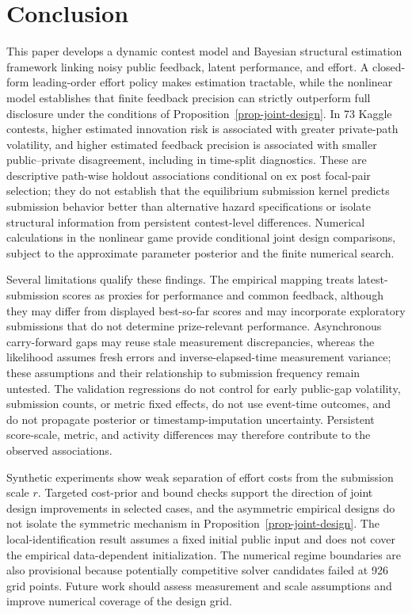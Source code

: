 \documentclass[mnsc]{informs3}
\begin{document}
\section{Conclusion}

{This paper develops a dynamic contest model and Bayesian structural estimation framework linking noisy public feedback, latent performance, and effort. A closed-form leading-order effort policy makes estimation tractable, while the nonlinear model establishes that finite feedback precision can strictly outperform full disclosure under the conditions of Proposition~\ref{prop-joint-design}. In 73 Kaggle contests, higher estimated innovation risk is associated with greater private-path volatility, and higher estimated feedback precision is associated with smaller public--private disagreement, including in time-split diagnostics. These are descriptive path-wise holdout associations conditional on ex post focal-pair selection; they do not establish that the equilibrium submission kernel predicts submission behavior better than alternative hazard specifications or isolate structural information from persistent contest-level differences. Numerical calculations in the nonlinear game provide conditional joint design comparisons, subject to the approximate parameter posterior and the finite numerical search.}

{Several limitations qualify these findings. The empirical mapping treats latest-submission scores as proxies for performance and common feedback, although they may differ from displayed best-so-far scores and may incorporate exploratory submissions that do not determine prize-relevant performance. Asynchronous carry-forward gaps may reuse stale measurement discrepancies, whereas the likelihood assumes fresh errors and inverse-elapsed-time measurement variance; these assumptions and their relationship to submission frequency remain untested. The validation regressions do not control for early public-gap volatility, submission counts, or metric fixed effects, do not use event-time outcomes, and do not propagate posterior or timestamp-imputation uncertainty. Persistent score-scale, metric, and activity differences may therefore contribute to the observed associations.}

{{Synthetic experiments show weak separation of effort costs from the submission scale $r$. Targeted cost-prior and bound checks support the direction of joint design improvements in selected cases, and the asymmetric empirical designs do not isolate the symmetric mechanism in Proposition~\ref{prop-joint-design}.} The local-identification result assumes a fixed initial public input and does not cover the empirical data-dependent initialization. The numerical regime boundaries are also provisional because potentially competitive solver candidates failed at 926 grid points. Future work should assess measurement and scale assumptions and improve numerical coverage of the design grid.}
\end{document}
